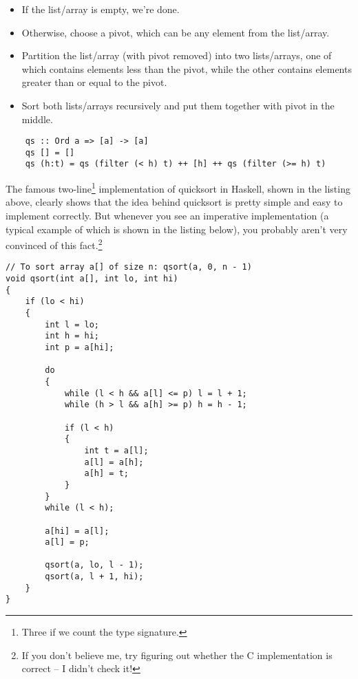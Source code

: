 \documentclass[declaration,mgr,english,shortabstract]{iithesis}
\begin{document}
\begin{itemize}
    \item If the list/array is empty, we're done.
    \item Otherwise, choose a pivot, which can be any element from the list/array.
    \item Partition the list/array (with pivot removed) into two lists/arrays, one of which contains elements less than the pivot, while the other contains elements greater than or equal to the pivot.
    \item Sort both lists/arrays recursively and put them together with pivot in the middle.
\end{itemize}

\begin{verbatim}
    qs :: Ord a => [a] -> [a]
    qs [] = []
    qs (h:t) = qs (filter (< h) t) ++ [h] ++ qs (filter (>= h) t)
\end{verbatim}

The famous two-line\footnote{Three if we count the type signature.} implementation of quicksort in Haskell, shown in the listing above, clearly shows that the idea behind quicksort is pretty simple and easy to implement correctly. But whenever you see an imperative implementation (a typical example of which is shown in the listing below), you probably aren't very convinced of this fact.\footnote{If you don't believe me, try figuring out whether the C implementation is correct -- I didn't check it!}

\begin{verbatim}
// To sort array a[] of size n: qsort(a, 0, n - 1)
void qsort(int a[], int lo, int hi)
{
    if (lo < hi)
    {
        int l = lo;
        int h = hi;
        int p = a[hi];

        do
        {
            while (l < h && a[l] <= p) l = l + 1;
            while (h > l && a[h] >= p) h = h - 1;

            if (l < h)
            {
                int t = a[l];
                a[l] = a[h];
                a[h] = t;
            }
        }
        while (l < h);

        a[hi] = a[l];
        a[l] = p;

        qsort(a, lo, l - 1);
        qsort(a, l + 1, hi);
    }
}
\end{verbatim}
\end{document}
